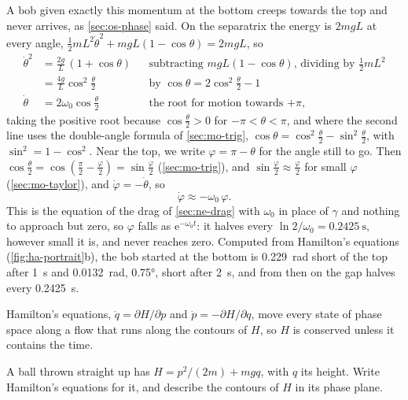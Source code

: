 A bob given exactly this momentum at the bottom creeps towards the top
and never arrives, as \cref{sec:os-phase} said. On the separatrix the
energy is $2mgL$ at every angle, $\frac12 mL^2\dot\theta^2 + mgL(1 -
\cos\theta) = 2mgL$, so
\begin{align*}
   \dot\theta^2 &= \frac{2g}{L}\,(1 + \cos\theta)
   && \text{subtracting $mgL(1 - \cos\theta)$, dividing by
   $\tfrac12 mL^2$}\\
   &= \frac{4g}{L}\cos^2\frac{\theta}{2}
   && \text{by $\cos\theta = 2\cos^2\tfrac{\theta}{2} - 1$}\\
   \dot\theta &= 2\omega_0\cos\frac{\theta}{2}
   && \text{the root for motion towards $+\pi$,}
\end{align*}
taking the positive root because $\cos\frac{\theta}{2} > 0$ for $-\pi <
\theta < \pi$, and where the second line uses the double-angle formula of
\cref{sec:mo-trig},
$\cos\theta = \cos^2\frac{\theta}{2} - \sin^2\frac{\theta}{2}$, with
$\sin^2 = 1 - \cos^2$. Near the top, we write $\varphi = \pi - \theta$
for the angle still to go. Then $\cos\frac{\theta}{2} = \cos(\frac{\pi}{2} -
\frac{\varphi}{2}) = \sin\frac{\varphi}{2}$ (\cref{sec:mo-trig}), and $\sin\frac{\varphi}{2}
\approx \frac{\varphi}{2}$ for small $\varphi$ (\cref{sec:mo-taylor}), and $\dot\varphi = -\dot\theta$,
so
\begin{equation*}
   \dot\varphi \approx -\omega_0\,\varphi .
\end{equation*}
This is the equation of the drag of \cref{sec:ne-drag} with $\omega_0$ in
place of $\gamma$ and nothing to approach but zero, so $\varphi$ falls as
$\mathrm{e}^{-\omega_0t}$: it halves every $\ln 2/\omega_0 =
\SI{0.2425}{\second}$, however small it is, and never reaches zero.
Computed from Hamilton's equations (\cref{fig:ha-portrait}b), the bob
started at the bottom is \SI{0.229}{\radian} short of the top after
\SI{1}{\second} and \SI{0.0132}{\radian}, \ang{0.75}, short after
\SI{2}{\second}, and from then on the gap halves every
\SI{0.2425}{\second}.

\begin{keyidea}
Hamilton's equations, $\dot{q} = \partial H/\partial p$ and $\dot{p} =
-\partial H/\partial q$, move every state of phase space along a flow
that runs along the contours of $H$, so $H$ is conserved unless it
contains the time.
\end{keyidea}


\begin{selfcheck}
A ball thrown straight up has $H = p^2/(2m) + mgq$, with $q$ its height.
Write Hamilton's equations for it, and describe the contours of $H$ in
its phase plane.
\end{selfcheck}
